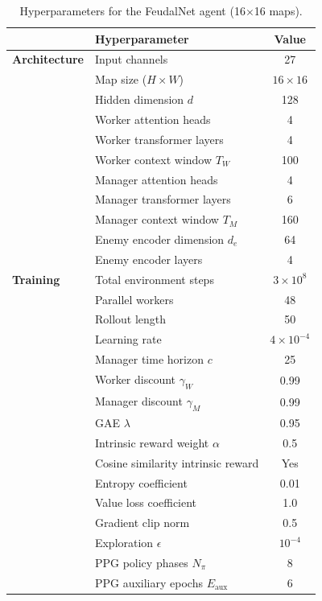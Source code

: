 \documentclass[sigconf,review=false]{acmart}
\begin{document}
\clearpage

\begin{table}[ht]
\centering
\caption{Hyperparameters for the FeudalNet agent (16$\times$16 maps).}
\label{tab:hyperparams}
\begin{tabular}{llc}
\toprule
& \textbf{Hyperparameter} & \textbf{Value} \\
\midrule
\textbf{Architecture}
& Input channels                          & 27 \\
& Map size ($H \times W$)                 & $16 \times 16$ \\
& Hidden dimension $d$                    & 128 \\
& Worker attention heads                  & 4 \\
& Worker transformer layers               & 4 \\
& Worker context window $T_W$             & 100 \\
& Manager attention heads                 & 4 \\
& Manager transformer layers              & 6 \\
& Manager context window $T_M$            & 160 \\
& Enemy encoder dimension $d_e$           & 64 \\
& Enemy encoder layers                    & 4 \\
\midrule
\textbf{Training}
& Total environment steps                 & $3 \times 10^{8}$ \\
& Parallel workers                        & 48 \\
& Rollout length                          & 50 \\
& Learning rate                           & $4 \times 10^{-4}$ \\
& Manager time horizon $c$                & 25 \\
& Worker discount $\gamma_W$              & 0.99 \\
& Manager discount $\gamma_M$             & 0.99 \\
& GAE $\lambda$                           & 0.95 \\
& Intrinsic reward weight $\alpha$        & 0.5 \\
& Cosine similarity intrinsic reward      & Yes \\
& Entropy coefficient                     & 0.01 \\
& Value loss coefficient                  & 1.0 \\
& Gradient clip norm                      & 0.5 \\
& Exploration $\epsilon$                  & $10^{-4}$ \\
& PPG policy phases $N_\pi$               & 8 \\
& PPG auxiliary epochs $E_{\text{aux}}$   & 6 \\
\bottomrule
\end{tabular}
\end{table}
\end{document}
